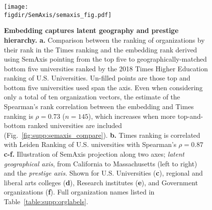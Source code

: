 \documentclass[12pt]{article} %
\def\figdir{../Figs}
\begin{document}
%
%
\begin{figure}[hp!]
	\centering
	\texttt{[image: \\figdir/SemAxis/semaxis\_fig.pdf]}
	\caption{
		\textbf{Embedding captures latent geography and prestige hierarchy.}
		\textbf{a.} Comparison between the ranking of organizations by their rank in the Times ranking and the embedding rank derived using SemAxis pointing from the top five to geographically-matched bottom five universities ranked by the 2018 Times Higher Education ranking of U.S. Universities.
		Un-filled points are those top and bottom five universities used span the axis.
	  	Even when considering only a total of ten organization vectors, the estimate of the Spearman's rank correlation between the embedding and Times ranking is $\rho = 0.73$ ($n = 145$), which increases when more top-and-bottom ranked universities are included (Fig.~\ref{fig:supp:semaxis_compare}).
	  	\textbf{b.} Times ranking is correlated with Leiden Ranking of U.S. universities with Spearman's $\rho = 0.87$
		\textbf{c-f.} Illustration of SemAxis projection along two axes;  \textit{latent geographical axis}, from California to Massachusetts (left to right) and the \textit{prestige axis}.
		Shown for U.S. Universities (\textbf{c}), regional and liberal arts colleges (\textbf{d}), Research institutes (\textbf{e}), and Government organizations (\textbf{f}).
		Full organization names listed in Table~\ref{table:supp:orglabels}.
	}
	\label{fig:semaxis}
\end{figure}
\end{document}
